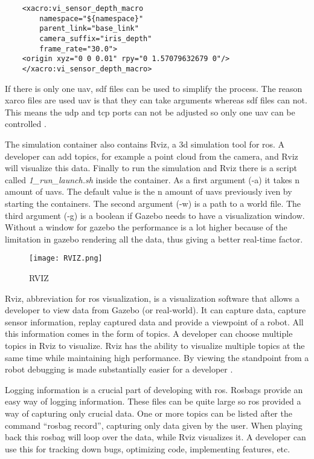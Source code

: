 \begin{verbatim}
    <xacro:vi_sensor_depth_macro
        namespace="${namespace}"
        parent_link="base_link"
        camera_suffix="iris_depth"
        frame_rate="30.0">
    <origin xyz="0 0 0.01" rpy="0 1.57079632679 0"/>
    </xacro:vi_sensor_depth_macro>

\end{verbatim}

If there is only one \acs{uav}, \acs{sdf} files can be used to simplify the process. The reason xarco files are used \acs{uav} is that 
they can take arguments 
whereas \acs{sdf} files can not. 
This means the \acs{udp} and \acs{tcp} ports can not be adjusted so only one \acs{uav} can be controlled \cite{sim:issue}. 

\newpage
The simulation container also contains Rviz, a \acs{3d} simulation tool for \acs{ros}. A developer can add topics, 
for example a point cloud from the camera, 
and Rviz will visualize this data.     
Finally to run the simulation and Rviz there is a script called \textit{1\_run\_launch.sh} inside the container. 
As a first argument (-a) it takes n amount of \acp{uav}. The default value is the n amount of \acp{uav} previously 
iven by starting the containers. 
The second argument (-w) is a path to a world file. The third argument (-g) is a boolean if Gazebo needs to have a visualization window. 
Without a window for gazebo the performance is a lot higher because of the limitation in gazebo rendering all 
the data, thus giving a better real-time factor.

\begin{figure}[ht]
    \centering
    \texttt{[image: RVIZ.png]}
    \caption[RIVZ]{RVIZ}
\end{figure}

Rviz, abbreviation for \acs{ros} visualization, is a visualization software that allows a developer to view data from Gazebo (or real-world). 
It can capture data, capture sensor information, replay captured data and provide a viewpoint of a robot. All this information 
comes in the form of topics. 
A developer can choose multiple topics in Rviz to visualize. Rviz has the ability to visualize multiple topics at the same 
time while maintaining high performance. 
By viewing the standpoint from a robot debugging is made substantially easier for a developer \cite{ros:rviz}.


Logging information is a crucial part of developing with \acs{ros}. Rosbags provide an easy way of logging information. 
These files can be quite large so \acs{ros} provided a way of capturing only crucial data. 
One or more topics can be listed after the command “rosbag record”, capturing only data given by the user. When playing back this rosbag will 
loop over the data, while Rviz visualizes it. A developer can use this for tracking down bugs, optimizing code, implementing features, etc.